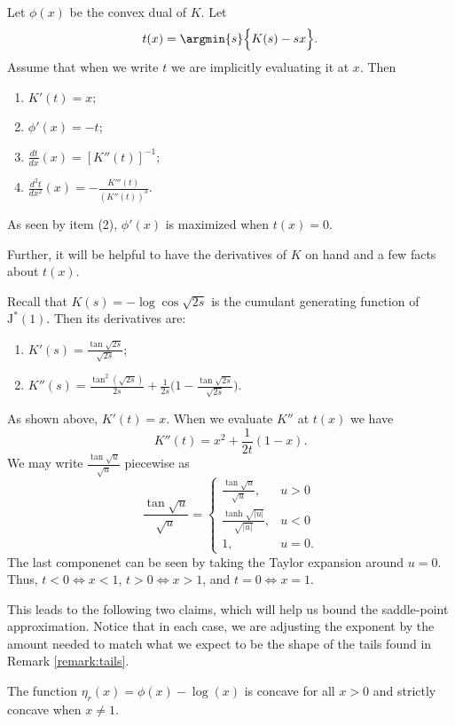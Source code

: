\documentclass[12pt]{article}
\newcommand{\JJ}{\text{J}^*}
\newcommand{\utanh}[1]{\frac{\tanh{\sqrt{#1}}}{\sqrt{#1}}}
\newcommand{\utan}[1]{\frac{\tan{\sqrt{#1}}}{\sqrt{#1}}}
\newcommand{\dd}[2]{\frac{d #1}{d #2}}
\begin{document}
\begin{fact}
\label{fact:dual}
Let $\phi(x)$ be the convex dual of $K$.  Let 
\[
t(x) = \argmin{s} \Big\{ K(s) - s x \Big\}.
\]
Assume that when we write $t$ we are implicitly evaluating it at $x$.  Then
\begin{enumerate}
\item $\displaystyle K'(t) = x$;
\item $\displaystyle \phi'(x) = -t$;
\item $\displaystyle \dd{t}{x}(x) = [K''(t)]^{-1}$;
\item $\displaystyle \dd{^2 t}{x^2}(x) = - \frac{K'''(t)}{(K''(t))^3}$.
\end{enumerate}
As seen by item (2), $\phi'(x)$ is maximized when $t(x)=0$.
\end{fact}
Further, it will be helpful to have the derivatives of $K$ on hand and a few
facts about $t(x)$.
\begin{fact}
\label{fact:cgf-derivatives}
  Recall that $K(s) = - \log \cos \sqrt{2s}$ is the
  cumulant generating function of $\JJ(1)$.  Then its derivatives are:
\begin{enumerate}
\item $\displaystyle K'(s) = \utan{2s}$;
\item $\displaystyle K''(s) = \frac{\tan^2(\sqrt{2s})}{2s} + \frac{1}{2s} \Big(1
  - \utan{2s} \Big)$.
\end{enumerate}
As shown above, $K'(t) = x$.  When we evaluate $K''$ at $t(x)$ we have
\[
K''(t) = x^2 + \frac{1}{2t} (1 - x).
\]
We may write $\utan{u}$ piecewise as
\[
\utan{u} = 
\begin{cases}
\utan{u}, & u > 0 \\
\utanh{|u|},  & u < 0 \\
1, & u = 0.
\end{cases}
\]
The last componenet can be seen by taking the Taylor expansion around $u=0$.
Thus, $t < 0 \iff x < 1$, $t> 0 \iff x > 1$, and $t=0 \iff x = 1$.
\end{fact}

This leads to the following two claims, which will help us bound the
saddle-point approximation.  Notice that in each case, we are adjusting the
exponent by the amount needed to match what we expect to be the shape of the
tails found in Remark \ref{remark:tails}.

\begin{lemma}
  The function $\eta_r(x) = \phi(x) - \log(x)$ is concave for all $x > 0$ and
  strictly concave when $x \neq 1$.
\end{lemma}
\end{document}
